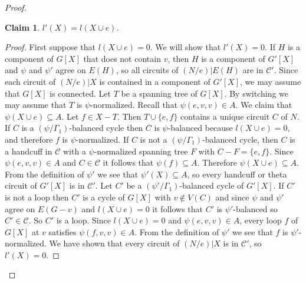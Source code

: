\documentclass[12pt]{article}
\newtheorem{claim}{Claim}[theorem]
\theoremstyle{definition}
\newcommand{\cC}{\mathcal{C}}
\begin{document}
\begin{proof}
\begin{claim} \label{claim: l-value comparison in loop case}
$l'(X) = l(X \cup e)$.
\end{claim}
\begin{proof}
First suppose that $l(X \cup e) = 0$.
We will show that $l'(X) = 0$.
If $H$ is a component of $G[X]$ that does not contain $v$, then $H$ is a component of $G'[X]$ and $\psi$ and $\psi'$ agree on $E(H)$, so all circuits of $(N/e)|E(H)$ are in $\cC'$.
Since each circuit of $(N/e)|X$ is contained in a component of $G'[X]$, we may assume that $G[X]$ is connected.
Let $T$ be a spanning tree of $G[X]$.
By switching we may assume that $T$ is $\psi$-normalized.
Recall that $\psi(e, v, v) \in A$.
We claim that $\psi(X \cup e) \subseteq A$.
Let $f \in X - T$.
Then $T \cup \{e,f\}$ contains a unique circuit $C$ of $N$.
If $C$ is a $(\psi/\Gamma_1)$-balanced cycle then $C$ is $\psi$-balanced because $l(X \cup e) = 0$, and therefore $f$ is $\psi$-normalized.
If $C$ is not a $(\psi/\Gamma_1)$-balanced cycle, then $C$ is a handcuff in $\cC$ with a $\psi$-normalized spanning tree $F$ with $C - F = \{e,f\}$.
Since $\psi(e,v,v) \in A$ and $C \in \cC$ it follows that $\psi(f) \subseteq A$.
Therefore $\psi(X \cup e) \subseteq A$.
From the definition of $\psi'$ we see that $\psi'(X) \subseteq A$, so every handcuff or theta circuit of $G'[X]$ is in $\cC'$.
Let $C'$ be a $(\psi'/\Gamma_1)$-balanced cycle of $G'[X]$.
If $C'$ is not a loop then $C'$ is a cycle of $G[X]$ with $v \notin V(C)$ and since $\psi$ and $\psi'$ agree on $E(G - v)$ and $l(X \cup e) = 0$ it follows that $C'$ is $\psi'$-balanced so $C' \in \cC$.
So $C'$ is a loop.
Since $l(X \cup e) = 0$ and $\psi(e, v, v) \in A$, every loop $f$ of $G[X]$ at $v$ satisfies $\psi(f, v, v) \in A$.
From the definition of $\psi'$ we see that $f$ is $\psi'$-normalized.
We have shown that every circuit of $(N/e)|X$ is in $\cC'$, so $l'(X) = 0$.



\end{proof}
\end{proof}
\end{document}

